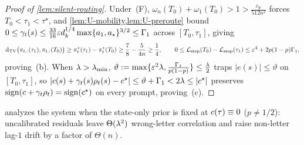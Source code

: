\begin{proof}[Proof of \cref{lem:silent-routing}]
Under~(F), $\omega_n(T_0)+\omega_1(T_0) > 1 > \frac{c_{\mathrm F}}{512n^2}$ forces $T_0 < \tau_1 < \tau^\star$, and \cref{lem:U-mobility,lem:U-preroute} bound $0 \le \gamma_t(s) \le \frac{33}{16}\varepsilon d_k^{1/4}\max\{a_1, a_\star\}^{3/2} \le \Gamma_1$ across $[T_0, \tau_1]$, giving
\[
  \mathrm{d}_{\mathrm{TV}}\bigl(\pi_{t,\cdot}(\tau_1), \pi_{t,\cdot}(T_0)\bigr) \ge \pi_t^\star(\tau_1) - \pi_t^\star(T_0) \ge \frac{7}{8} - \frac{5}{4n} \ge \frac{1}{4},
  \qquad
  0 \le \mathcal L_{\mathrm{step}}(T_0) - \mathcal L_{\mathrm{step}}(\tau_1) \le \varepsilon^4 + 2p(1-p)\Gamma_1,
\]
proving~(b). When $\lambda > \lambda_{\min}$, $\vartheta := \max\{\varepsilon^2\lambda, \frac{\Gamma_1}{p(1-p)}\} \le \frac{\lambda}{2}$ traps $|e(s)| \le \vartheta$ on $[T_0, \tau_1]$, so $|c(s) + \gamma_t(s)\rho_t(s) - c^\star| \le \vartheta + \Gamma_1 < 2\lambda \le |c^\star|$ preserves $\operatorname{sign}(c + \gamma_t\rho_t) = \operatorname{sign}(c^\star)$ on every prompt, proving~(c).
\end{proof}

 analyzes the system when the state-only prior is fixed at $c(\tau) \equiv 0$ ($p \ne 1/2$): uncalibrated residuals leave $\Theta(\lambda^2)$ wrong-letter correlation and raise non-letter lag-$1$ drift by a factor of $\Theta(n)$.

